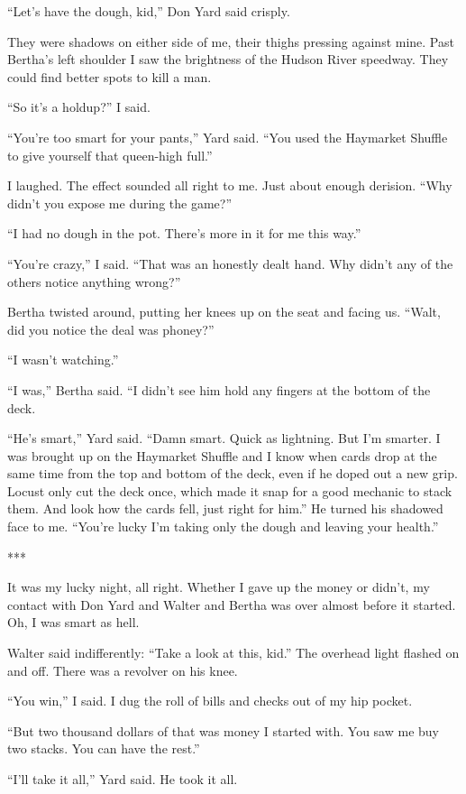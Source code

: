 \documentclass{novel}
\begin{document}
“Let’s have the dough, kid,” Don Yard said crisply.

They were shadows on either side of me, their thighs pressing against mine. Past Bertha’s left shoulder I saw the brightness of the Hudson River speedway. They could find better spots to kill a man.

“So it’s a holdup?” I said.

“You’re too smart for your pants,” Yard said. “You used the Haymarket Shuffle to give yourself that queen-high full.”

I laughed. The effect sounded all right to me. Just about enough derision. “Why didn’t you expose me during the game?”

“I had no dough in the pot. There’s more in it for me this way.”

“You’re crazy,” I said. “That was an honestly dealt hand. Why didn’t any of the others notice anything wrong?”

Bertha twisted around, putting her knees up on the seat and facing us. “Walt, did you notice the deal was phoney?”

“I wasn’t watching.”

“I was,” Bertha said. “I didn’t see him hold any fingers at the bottom of the deck.

“He’s smart,” Yard said. “Damn smart. Quick as lightning. But I’m smarter. I was brought up on the Haymarket Shuffle and I know when cards drop at the same time from the top and bottom of the deck, even if he doped out a new grip. Locust only cut the deck once, which made it snap for a good mechanic to stack them. And look how the cards fell, just right for him.” He turned his shadowed face to me. “You’re lucky I’m taking only the dough and leaving your health.”

***

It was my lucky night, all right. Whether I gave up the money or didn’t, my contact with Don Yard and Walter and Bertha was over almost before it started. Oh, I was smart as hell.

Walter said indifferently: “Take a look at this, kid.” The overhead light flashed on and off. There was a revolver on his knee.

“You win,” I said. I dug the roll of bills and checks out of my hip pocket.

“But two thousand dollars of that was money I started with. You saw me buy two stacks. You can have the rest.”

“I’ll take it all,” Yard said. He took it all.
\end{document}
